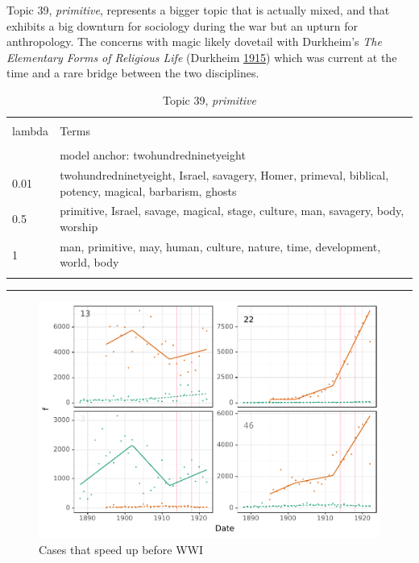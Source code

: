 \documentclass[]{book}
\theoremstyle{definition}
\theoremstyle{definition}
\theoremstyle{definition}
\theoremstyle{remark}
\begin{document}
Topic 39, \emph{primitive}, represents a bigger topic that is actually
mixed, and that exhibits a big downturn for sociology during the war but
an upturn for anthropology. The concerns with magic likely dovetail with
Durkheim's \emph{The Elementary Forms of Religious Life} (Durkheim
\protect\hyperlink{ref-Durkheim1915Elementary}{1915}) which was current
at the time and a rare bridge between the two disciplines.



\begin{table}[!htbp] \centering 
  \caption{Topic 39, \emph{primitive}} 
  \label{tab:t39-h} 
\begin{tabularx}{\textwidth}{@{\extracolsep{5pt}} lY} 
\\[-1.8ex]\hline 
\hline \\[-1.8ex] 
lambda & Terms \\ 
\hline \\[-1.8ex] 
 & model anchor: twohundredninetyeight \\ 
0.01 & twohundredninetyeight, Israel, savagery, Homer, primeval, biblical, potency, magical, barbarism, ghosts \\ 
0.5 & primitive, Israel, savage, magical, stage, culture, man, savagery, body, worship \\ 
1 & man, primitive, may, human, culture, nature, time, development, world, body \\ 
\hline \\[-1.8ex] 
\end{tabularx} 
\end{table}

\begin{center}\rule{0.5\linewidth}{\linethickness}\end{center}

\begin{figure}

{\centering \includegraphics[width=0.9\linewidth]{04_files/figure-latex/spdup-1} 

}

\caption{Cases that speed up before WWI}\label{fig:spdup}
\end{figure}
\end{document}
